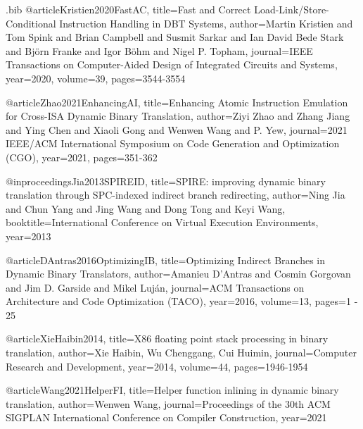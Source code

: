\begin{filecontents}{\jobname.bib}
@article{Kristien2020FastAC,
  title={Fast and Correct Load-Link/Store-Conditional Instruction Handling in DBT Systems},
  author={Martin Kristien and Tom Spink and Brian Campbell and Susmit Sarkar and Ian David Bede Stark and Bj{\"o}rn Franke and Igor B{\"o}hm and Nigel P. Topham},
  journal={IEEE Transactions on Computer-Aided Design of Integrated Circuits and Systems},
  year={2020},
  volume={39},
  pages={3544-3554}
}

@article{Zhao2021EnhancingAI,
  title={Enhancing Atomic Instruction Emulation for Cross-ISA Dynamic Binary Translation},
  author={Ziyi Zhao and Zhang Jiang and Ying Chen and Xiaoli Gong and Wenwen Wang and P. Yew},
  journal={2021 IEEE/ACM International Symposium on Code Generation and Optimization (CGO)},
  year={2021},
  pages={351-362}
}

@inproceedings{Jia2013SPIREID,
  title={SPIRE: improving dynamic binary translation through SPC-indexed indirect branch redirecting},
  author={Ning Jia and Chun Yang and Jing Wang and Dong Tong and Keyi Wang},
  booktitle={International Conference on Virtual Execution Environments},
  year={2013}
}

@article{DAntras2016OptimizingIB,
  title={Optimizing Indirect Branches in Dynamic Binary Translators},
  author={Amanieu D'Antras and Cosmin Gorgovan and Jim D. Garside and Mikel Luj{\'a}n},
  journal={ACM Transactions on Architecture and Code Optimization (TACO)},
  year={2016},
  volume={13},
  pages={1 - 25}
}

@article{XieHaibin2014,
  title={X86 floating point stack processing in binary translation},
  author={Xie Haibin, Wu Chenggang, Cui Huimin},
  journal={Computer Research and Development},
  year={2014},
  volume={44},
  pages={1946-1954}
}

@article{Wang2021HelperFI,
  title={Helper function inlining in dynamic binary translation},
  author={Wenwen Wang},
  journal={Proceedings of the 30th ACM SIGPLAN International Conference on Compiler Construction},
  year={2021}
}

\end{filecontents}